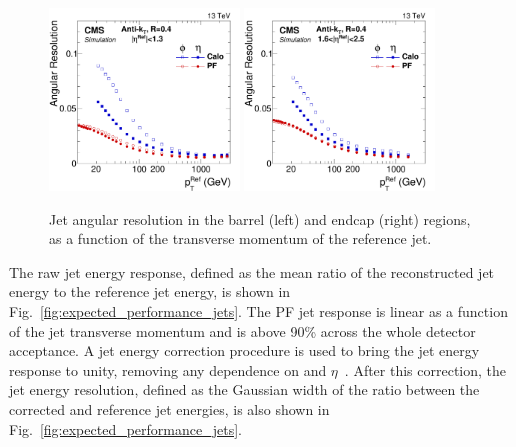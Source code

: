 \begin{figure}[htb]\centering 
\includegraphics[width=0.45\textwidth]{figs/cms/EtaPhiResVsRefPt_Barrel_AK4CaloL2L3_AK4PFL2L3_RMS_no2000.pdf} 
\includegraphics[width=0.45\textwidth]{figs/cms/EtaPhiResVsRefPt_Endcap_AK4CaloL2L3_AK4PFL2L3_RMS_no2000.pdf}
\caption{Jet angular resolution in the barrel (left) and endcap (right) regions, as a function of the transverse momentum of the reference jet.\label{fig:expected_performance_jets_angular}}
\end{figure}



The raw jet energy response, defined as the mean ratio of the
reconstructed jet energy to the reference jet energy, is shown in
Fig.~\ref{fig:expected_performance_jets}. The PF jet response is
linear as a function of the jet transverse momentum and is above 90\%
across the whole detector acceptance. A jet energy correction procedure is used to bring the jet energy
response to unity, removing any dependence on \pt and
$\eta$~\cite{Khachatryan:2016kdb}. After this correction, the jet
energy resolution, defined as the Gaussian width of the ratio between
the corrected and reference jet energies, is also shown in Fig.~\ref{fig:expected_performance_jets}.

